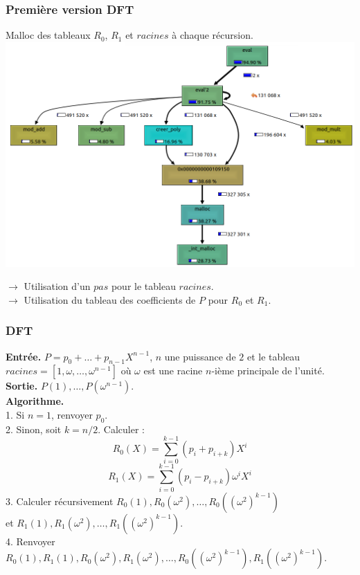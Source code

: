 \documentclass[8pt]{beamer}
\begin{document}
\begin{frame}
\frametitle{Première version DFT}

Malloc des tableaux $R_0$, $R_1$ et $racines$ à chaque récursion.\\[0.3cm]

\includegraphics[scale=0.5]{profiler_eval_malloc.png}

$\to$ Utilisation d'un $pas$ pour le tableau $racines$.\\ 
$\to$ Utilisation du tableau des coefficients de $P$ pour $R_0$ et $R_1$.

\end{frame}

\begin{frame}
\frametitle{DFT}

\begin{tcolorbox}[colback=cyan!5!white,
                  colframe=cyan!100!black,
                  title=\textbf{Algorithme DFT}
                 ]
\textbf{Entrée.} $P = p_0+\dots+p_{n-1}X^{n-1}$, $n$ une puissance de $2$ et le tableau $ racines = [1, \omega,\dots,\omega^{n-1}]$ où $\omega$ est une racine $n$-ième principale de l'unité.\\[0.1cm]
\textbf{Sortie.} $P(1),\dots,P(\omega^{n-1})$.\\[0.1cm]
\textbf{Algorithme.} \\[0.1cm]
1. \textit{}Si $n=1$, renvoyer $p_0$. \\ [0.1cm]
2. \textit{}Sinon, soit $k=n/2$. Calculer :\\
\[ R_0(X) = \sum_{i=0}^{k-1}(p_i+p_{i+k})X^i \]
\[ R_1(X) = \sum_{i=0}^{k-1}(p_i-p_{i+k})\omega^iX^i \]
3. \textit{}Calculer récursivement $R_0(1), R_0(\omega^2),\dots,R_0((\omega^2)^{k-1})$ \\ [0.1cm]
et $R_1(1), R_1(\omega^2),\dots,R_1((\omega^2)^{k-1})$. \\[0.2cm]
4. \textit{}Renvoyer $R_0(1), R_1(1), R_0(\omega^2), R_1(\omega^2),\dots, R_0((\omega^2)^{k-1}), R_1((\omega^2)^{k-1})$.
\end{tcolorbox}
\ \\

\end{frame}
\end{document}
